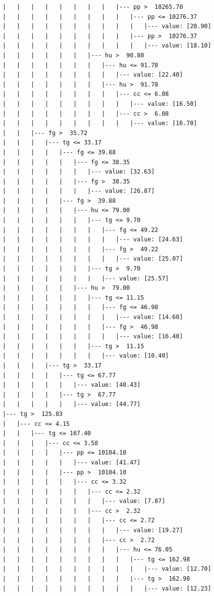 \documentclass[UTF8, a4paper]{ctexart}
\begin{document}
\begin{lstlisting}
|   |   |   |   |   |   |   |   |--- pp >  10265.70
|   |   |   |   |   |   |   |   |   |--- pp <= 10276.37
|   |   |   |   |   |   |   |   |   |   |--- value: [20.90]
|   |   |   |   |   |   |   |   |   |--- pp >  10276.37
|   |   |   |   |   |   |   |   |   |   |--- value: [18.10]
|   |   |   |   |   |   |--- hu >  90.80
|   |   |   |   |   |   |   |--- hu <= 91.78
|   |   |   |   |   |   |   |   |--- value: [22.40]
|   |   |   |   |   |   |   |--- hu >  91.78
|   |   |   |   |   |   |   |   |--- cc <= 6.08
|   |   |   |   |   |   |   |   |   |--- value: [16.50]
|   |   |   |   |   |   |   |   |--- cc >  6.08
|   |   |   |   |   |   |   |   |   |--- value: [16.70]
|   |   |--- fg >  35.72
|   |   |   |--- tg <= 33.17
|   |   |   |   |--- fg <= 39.88
|   |   |   |   |   |--- fg <= 38.35
|   |   |   |   |   |   |--- value: [32.63]
|   |   |   |   |   |--- fg >  38.35
|   |   |   |   |   |   |--- value: [26.87]
|   |   |   |   |--- fg >  39.88
|   |   |   |   |   |--- hu <= 79.00
|   |   |   |   |   |   |--- tg <= 9.70
|   |   |   |   |   |   |   |--- fg <= 49.22
|   |   |   |   |   |   |   |   |--- value: [24.63]
|   |   |   |   |   |   |   |--- fg >  49.22
|   |   |   |   |   |   |   |   |--- value: [25.07]
|   |   |   |   |   |   |--- tg >  9.70
|   |   |   |   |   |   |   |--- value: [25.57]
|   |   |   |   |   |--- hu >  79.00
|   |   |   |   |   |   |--- tg <= 11.15
|   |   |   |   |   |   |   |--- fg <= 46.98
|   |   |   |   |   |   |   |   |--- value: [14.60]
|   |   |   |   |   |   |   |--- fg >  46.98
|   |   |   |   |   |   |   |   |--- value: [16.40]
|   |   |   |   |   |   |--- tg >  11.15
|   |   |   |   |   |   |   |--- value: [10.40]
|   |   |   |--- tg >  33.17
|   |   |   |   |--- tg <= 67.77
|   |   |   |   |   |--- value: [40.43]
|   |   |   |   |--- tg >  67.77
|   |   |   |   |   |--- value: [44.77]
|--- tg >  125.83
|   |--- cc <= 4.15
|   |   |--- tg <= 167.40
|   |   |   |--- cc <= 3.58
|   |   |   |   |--- pp <= 10104.10
|   |   |   |   |   |--- value: [41.47]
|   |   |   |   |--- pp >  10104.10
|   |   |   |   |   |--- cc <= 3.32
|   |   |   |   |   |   |--- cc <= 2.32
|   |   |   |   |   |   |   |--- value: [7.87]
|   |   |   |   |   |   |--- cc >  2.32
|   |   |   |   |   |   |   |--- cc <= 2.72
|   |   |   |   |   |   |   |   |--- value: [19.27]
|   |   |   |   |   |   |   |--- cc >  2.72
|   |   |   |   |   |   |   |   |--- hu <= 76.05
|   |   |   |   |   |   |   |   |   |--- tg <= 162.98
|   |   |   |   |   |   |   |   |   |   |--- value: [12.70]
|   |   |   |   |   |   |   |   |   |--- tg >  162.98
|   |   |   |   |   |   |   |   |   |   |--- value: [12.23]

\end{lstlisting}
\end{document}
